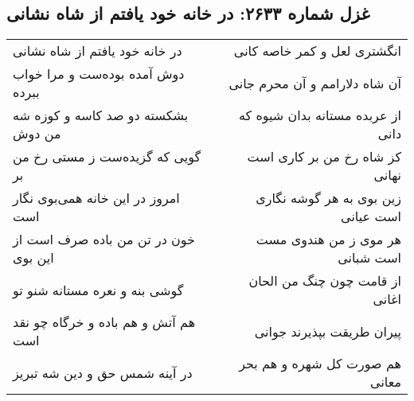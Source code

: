 \begin{center}
\section*{غزل شماره ۲۶۳۳: در خانه خود یافتم از شاه نشانی}
\label{sec:2633}
\begin{longtable}{l p{0.5cm} r}
در خانه خود یافتم از شاه نشانی
&&
انگشتری لعل و کمر خاصه کانی
\\
دوش آمده بوده‌ست و مرا خواب ببرده
&&
آن شاه دلارامم و آن محرم جانی
\\
بشکسته دو صد کاسه و کوزه شه من دوش
&&
از عربده مستانه بدان شیوه که دانی
\\
گویی که گزیده‌ست ز مستی رخ من بر
&&
کز شاه رخ من بر کاری است نهانی
\\
امروز در این خانه همی‌بوی نگار است
&&
زین بوی به هر گوشه نگاری است عیانی
\\
خون در تن من باده صرف است از این بوی
&&
هر موی ز من هندوی مست است شبانی
\\
گوشی بنه و نعره مستانه شنو تو
&&
از قامت چون چنگ من الحان اغانی
\\
هم آتش و هم باده و خرگاه چو نقد است
&&
پیران طریقت بپذیرند جوانی
\\
در آینه شمس حق و دین شه تبریز
&&
هم صورت کل شهره و هم بحر معانی
\\
\end{longtable}
\end{center}
